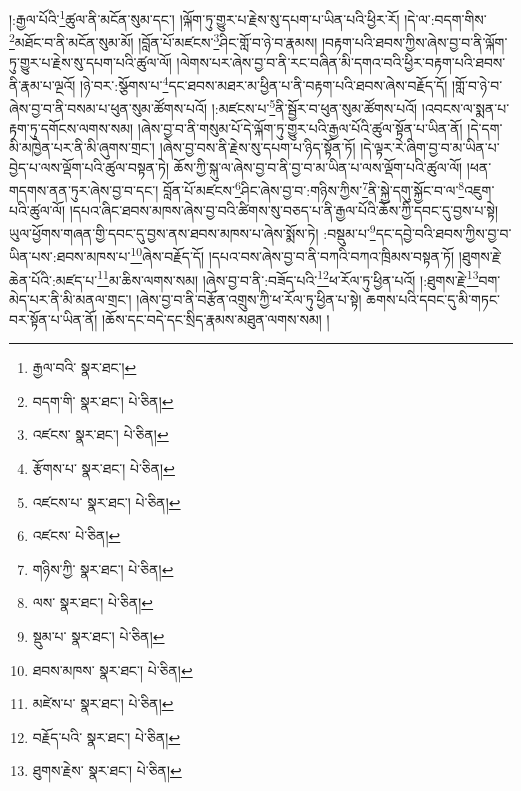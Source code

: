 །:རྒྱལ་པོའི་\footnote{རྒྱལ་བའི་  སྣར་ཐང་། }ཚུལ་ནི་མངོན་སུམ་དང་། །ལྐོག་ཏུ་གྱུར་པ་རྗེས་སུ་དཔག་པ་ཡིན་པའི་ཕྱིར་རོ། །དེ་ལ་:བདག་གིས་\footnote{བདག་གི་  སྣར་ཐང་།  པེ་ཅིན། }མཐོང་བ་ནི་མངོན་སུམ་མོ། །བློན་པོ་མཛངས་\footnote{འཛངས་  སྣར་ཐང་།  པེ་ཅིན། }ཤིང་གློ་བ་ཉེ་བ་རྣམས། །བརྟག་པའི་ཐབས་ཀྱིས་ཞེས་བྱ་བ་ནི་ལྐོག་ཏུ་གྱུར་པ་རྗེས་སུ་དཔག་པའི་ཚུལ་ལོ། །ལེགས་པར་ཞེས་བྱ་བ་ནི་རང་བཞིན་མི་དགའ་བའི་ཕྱིར་བརྟག་པའི་ཐབས་ནི་རྣམ་པ་ལྔའོ། །ཉེ་བར་:སྩོགས་པ་\footnote{རྩོགས་པ་  སྣར་ཐང་།  པེ་ཅིན། }དང་ཐབས་མཐར་མ་ཕྱིན་པ་ནི་བརྟག་པའི་ཐབས་ཞེས་བརྗོད་དོ། །གློ་བ་ཉེ་བ་ཞེས་བྱ་བ་ནི་བསམ་པ་ཕུན་སུམ་ཚོགས་པའོ། །:མཛངས་པ་\footnote{འཛངས་པ་  སྣར་ཐང་།  པེ་ཅིན། }ནི་སྦྱོར་བ་ཕུན་སུམ་ཚོགས་པའོ། །འབངས་ལ་སྨན་པ་རྟག་ཏུ་དགོངས་ལགས་སམ། །ཞེས་བྱ་བ་ནི་གསུམ་པོ་དེ་ལྐོག་ཏུ་གྱུར་པའི་རྒྱལ་པོའི་ཚུལ་སྟོན་པ་ཡིན་ནོ། །དེ་དག་མི་མཁྱེན་པར་ནི་མི་ཞུགས་གྲང་། །ཞེས་བྱ་བས་ནི་རྗེས་སུ་དཔག་པ་ཉིད་སྟོན་ཏོ། །དེ་ལྟར་རེ་ཞིག་བྱ་བ་མ་ཡིན་པ་བྱེད་པ་ལས་ལྡོག་པའི་ཚུལ་བསྟན་ཏེ། ཆོས་ཀྱི་སྐུ་ལ་ཞེས་བྱ་བ་ནི་བྱ་བ་མ་ཡིན་པ་ལས་ལྡོག་པའི་ཚུལ་ལོ། །ཕན་གདགས་ནན་ཏུར་ཞེས་བྱ་བ་དང་། བློན་པོ་མཛངས་\footnote{འཛངས་  པེ་ཅིན། }ཤིང་ཞེས་བྱ་བ་:གཉིས་ཀྱིས་\footnote{གཉིས་ཀྱི་  སྣར་ཐང་།  པེ་ཅིན། }ནི་སྐྱེ་དགུ་སྐྱོང་བ་ལ་\footnote{ལས་  སྣར་ཐང་།  པེ་ཅིན། }འཇུག་པའི་ཚུལ་ལོ། །དཔའ་ཞིང་ཐབས་མཁས་ཞེས་བྱ་བའི་ཚིགས་སུ་བཅད་པ་ནི་རྒྱལ་པོའི་ཆོས་ཀྱི་དབང་དུ་བྱས་པ་སྟེ། ཡུལ་ཕྱོགས་གཞན་གྱི་དབང་དུ་བྱས་ནས་ཐབས་མཁས་པ་ཞེས་སྨོས་ཏེ། :བསྡུམ་པ་\footnote{སྡུམ་པ་  སྣར་ཐང་།  པེ་ཅིན། }དང་དབྱེ་བའི་ཐབས་ཀྱིས་བྱ་བ་ཡིན་པས་:ཐབས་མཁས་པ་\footnote{ཐབས་མཁས་  སྣར་ཐང་།  པེ་ཅིན། }ཞེས་བརྗོད་དོ། །དཔའ་བས་ཞེས་བྱ་བ་ནི་བཀའི་བཀའ་ཁྲིམས་བསྟན་ཏོ། །ཐུགས་རྗེ་ཆེན་པོའི་:མཛད་པ་\footnote{མཛེས་པ་  སྣར་ཐང་།  པེ་ཅིན། }མ་ཆིས་ལགས་སམ། །ཞེས་བྱ་བ་ནི་:བཟོད་པའི་\footnote{བརྗོད་པའི་  སྣར་ཐང་།  པེ་ཅིན། }ཕ་རོལ་ཏུ་ཕྱིན་པའོ། །:ཐུགས་རྗེ་\footnote{ཐུགས་རྗེས་  སྣར་ཐང་།  པེ་ཅིན། }བག་མེད་པར་ནི་མི་མནལ་གྲང་། །ཞེས་བྱ་བ་ནི་བརྩོན་འགྲུས་ཀྱི་ཕ་རོལ་ཏུ་ཕྱིན་པ་སྟེ། ཆགས་པའི་དབང་དུ་མི་གཏང་བར་སྟོན་པ་ཡིན་ནོ། །ཆོས་དང་བདེ་དང་སྲིད་རྣམས་མཐུན་ལགས་སམ། །
